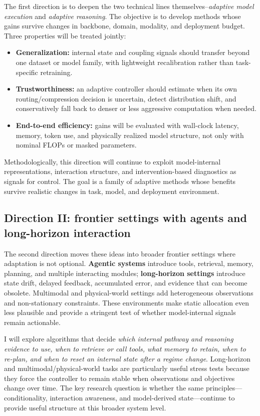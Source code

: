 \documentclass[12pt,a4paper]{article}
\begin{document}
The first direction is to deepen the two technical lines themselves--\emph{adaptive model execution} and \emph{adaptive reasoning}. The objective is to develop methods whose gains survive changes in backbone, domain, modality, and deployment budget. Three properties will be treated jointly:
\begin{itemize}
  \item \textbf{Generalization:} internal state and coupling signals should transfer beyond one dataset or model family, with lightweight recalibration rather than task-specific retraining.
  \item \textbf{Trustworthiness:} an adaptive controller should estimate when its own routing/compression decision is uncertain, detect distribution shift, and conservatively fall back to denser or less aggressive computation when needed.
  \item \textbf{End-to-end efficiency:} gains will be evaluated with wall-clock latency, memory, token use, and physically realized model structure, not only with nominal FLOPs or masked parameters.
\end{itemize}
Methodologically, this direction will continue to exploit model-internal representations, interaction structure, and intervention-based diagnostics as signals for control. The goal is a family of adaptive methods whose benefits survive realistic changes in task, model, and deployment environment.

\subsection{Direction II: frontier settings with agents and long-horizon interaction}

The second direction moves these ideas into broader frontier settings where adaptation is not optional. \textbf{Agentic systems} introduce tools, retrieval, memory, planning, and multiple interacting modules; \textbf{long-horizon settings} introduce state drift, delayed feedback, accumulated error, and evidence that can become obsolete. Multimodal and physical-world settings add heterogeneous observations and non-stationary constraints. These environments make static allocation even less plausible and provide a stringent test of whether model-internal signals remain actionable.

I will explore algorithms that decide \emph{which internal pathway and reasoning evidence to use, when to retrieve or call tools, what memory to retain, when to re-plan, and when to reset an internal state after a regime change}. Long-horizon and multimodal/physical-world tasks are particularly useful stress tests because they force the controller to remain stable when observations and objectives change over time. The key research question is whether the same principles---conditionality, interaction awareness, and model-derived state---continue to provide useful structure at this broader system level.
\end{document}
